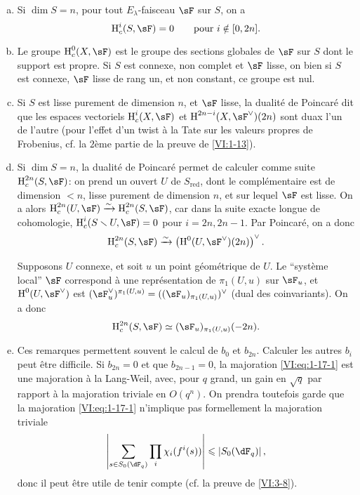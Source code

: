 \begin{enumerate}[a)]
  \item Si $\dim S=n$, pour tout $E_\lambda$-faisceau $\sF$ sur $S$, on a 
    \[
      \h_c^i(S,\sF) = 0 \qquad \text{pour $i\notin [0,2n]$.}
    \]
  \item Le groupe $\h_c^0(X,\sF)$ est le groupe des sections globales de $\sF$ 
    sur $S$ dont le support est propre. Si $S$ est connexe, non complet et 
    $\sF$ lisse, on bien si $S$ est connexe, $\sF$ lisse de rang un, et non 
    constant, ce groupe est nul.
  \item Si $S$ est lisse purement de dimension $n$, et $\sF$ lisse, la 
    dualit\'e de Poincar\'e dit que les espaces vectoriels 
    $\h_c^i(X,\sF)$ et $\h^{2n-i}(X,\sF^\vee)(2n)$ sont duax l'un de l'autre 
    (pour l'effet d'un twist \`a la Tate sur les valeurs propres de Frobenius, 
    cf. la $2$\`eme partie de la preuve de \ref{VI:1-13}).
  \item Si $\dim S=n$, la dualit\'e de Poincar\'e permet de calculer comme 
    suite $\h_c^{2n}(S,\sF)$: on prend un ouvert $U$ de $S_\text{red}$, dont le 
    compl\'ementaire est de dimension $<n$, lisse purement de dimension $n$, et 
    sur lequel $\sF$ est lisse. On a alors 
    $\h_c^{2n}(U,\sF) \iso \h_c^{2n}(S,\sF)$, car dans la suite exacte longue 
    de cohomologie, $\h_c^i(S\setminus U,\sF) = 0$ pour $i=2n,2n-1$. Par 
    Poincar\'e, on a donc 
    \[
      \h_c^{2n}(S,\sF) \iso \left(\h^0(U,\sF^\vee)(2n)\right)^\vee \text{.}
    \]
    
    Supposons $U$ connexe, et soit $u$ un point g\'eom\'etrique de $U$. Le 
    ``syst\`eme local'' $\sF$ correspond \`a une repr\'esentation de 
    $\pi_1(U,u)$ sur $\sF_u$, et $\h^0(U,\sF^\vee)$ est 
    $(\sF_u^\vee)^{\pi_1(U,u)}=((\sF_u)_{\pi_1(U,u)})^\vee$ (dual des 
    coinvariants). On a donc 
    \[
      \h_c^{2n}(S,\sF) \simeq (\sF_u)_{\pi_1(U,u)}(-2n) \text{.}
    \]
  \item Ces remarques permettent souvent le calcul de $b_0$ et $b_{2n}$. 
    Calculer les autres $b_i$ peut \^etre difficile. Si $b_{2n}=0$ et que 
    $b_{2n-1}=0$, la majoration \eqref{VI:eq:1-17-1} est une majoration \`a la 
    Lang-Weil, avec, pour $q$ grand, un gain en $\sqrt q$ par rapport \`a la 
    majoration triviale en $O(q^n)$. On prendra toutefois garde que la 
    majoration \eqref{VI:eq:1-17-1} n'implique pas formellement la majoration 
    triviale 
    \[
      \left|\sum_{s\in S_0(\dF_q)} \prod_i \chi_i(f^i(s))\right| \leqslant \left| S_0(\dF_q)\right| \text{,}
    \]
    donc il peut \^etre utile de tenir compte (cf. la preuve de \ref{VI:3-8}). 
\end{enumerate}

